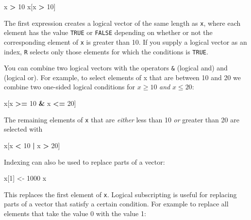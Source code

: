 \documentclass[
]{book}
\newenvironment{Shaded}{\begin{snugshade}}{\end{snugshade}}
\newcommand{\DecValTok}[1]{\textcolor[rgb]{0.00,0.00,0.81}{#1}}
\newcommand{\NormalTok}[1]{#1}
\newcommand{\OtherTok}[1]{\textcolor[rgb]{0.56,0.35,0.01}{#1}}
\newcommand{\SpecialCharTok}[1]{\textcolor[rgb]{0.81,0.36,0.00}{\textbf{#1}}}
\begin{document}
\begin{Shaded}
\begin{Highlighting}[]
\NormalTok{x }\SpecialCharTok{\textgreater{}} \DecValTok{10}
\NormalTok{x[x }\SpecialCharTok{\textgreater{}} \DecValTok{10}\NormalTok{]}
\end{Highlighting}
\end{Shaded}

The first expression creates a logical vector of the same length as
\texttt{x}, where each element has the value \texttt{TRUE} or
\texttt{FALSE} depending on whether or not the corresponding element
of \texttt{x} is greater than 10. If you supply a logical vector as an
index, \texttt{R} selects only those elements for which the conditions is
\texttt{TRUE}.

You can combine two logical vectors with the operators \texttt{\&}
(logical and) and \texttt{\textbar{}} (logical or). For example, to select
elements of x that are between 10 and 20 we combine two one-sided logical
conditions for \(x \geq 10\) \emph{and} \(x \leq 20\):

\begin{Shaded}
\begin{Highlighting}[]
\NormalTok{x[x }\SpecialCharTok{\textgreater{}=} \DecValTok{10} \SpecialCharTok{\&}\NormalTok{ x }\SpecialCharTok{\textless{}=} \DecValTok{20}\NormalTok{]}
\end{Highlighting}
\end{Shaded}

The remaining elements of \texttt{x} that are \emph{either} less than 10
\emph{or} greater than 20 are selected with

\begin{Shaded}
\begin{Highlighting}[]
\NormalTok{x[x }\SpecialCharTok{\textless{}} \DecValTok{10} \SpecialCharTok{|}\NormalTok{ x }\SpecialCharTok{\textgreater{}} \DecValTok{20}\NormalTok{]}
\end{Highlighting}
\end{Shaded}

Indexing can also be used to replace parts of a vector:

\begin{Shaded}
\begin{Highlighting}[]
\NormalTok{x[}\DecValTok{1}\NormalTok{] }\OtherTok{\textless{}{-}} \DecValTok{1000}
\NormalTok{x}
\end{Highlighting}
\end{Shaded}

This replaces the first element of \texttt{x}. Logical subscripting is
useful for replacing parts of a vector that satisfy a certain condition.
For example to replace all elements that take the value 0 with the value 1:
\end{document}
